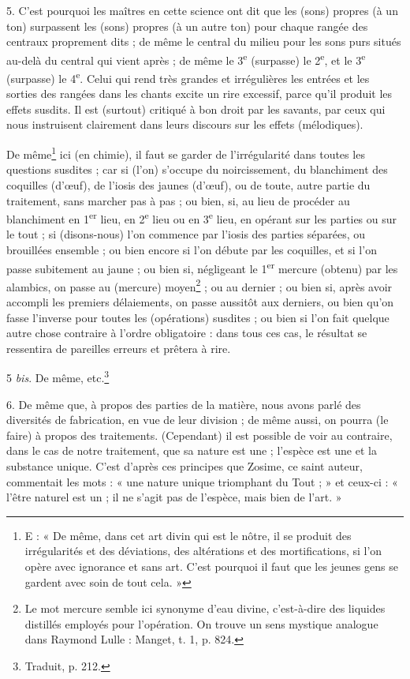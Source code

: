 \documentclass[a4paper, 11pt, oneside, polutonikogreek, french]{article}
\begin{document}
5. C'est pourquoi les maîtres en cette science ont dit que les (sons) propres (à un ton) surpassent les (sons) propres (à un autre ton) pour chaque rangée des centraux proprement dits ; de même le central du milieu pour les sons purs situés au-delà du central qui vient après ; de même le 3\textsuperscript{e} (surpasse) le 2\textsuperscript{e}, et le 3\textsuperscript{e} (surpasse) le 4\textsuperscript{e}. Celui qui rend très grandes et irrégulières les entrées et les sorties des rangées dans les chants excite un rire excessif, parce qu'il produit les effets susdits. Il est (surtout) critiqué à bon droit par les savants, par ceux qui nous instruisent clairement dans leurs discours sur les effets (mélodiques).

De même\footnote{E : « De même, dans cet art divin qui est le nôtre, il se produit des irrégularités et des déviations, des altérations et des mortifications, si l'on opère avec ignorance et sans art. C'est pourquoi il faut que les jeunes gens se gardent avec soin de tout cela. »} ici (en chimie), il faut se garder de l'irrégularité dans toutes les questions susdites ; car si (l'on) s'occupe du noircissement, du blanchiment des coquilles (d'œuf), de l'iosis des jaunes (d'œuf), ou de toute, autre partie du traitement, sans marcher pas à pas ; ou bien, si, au lieu de procéder au blanchiment en 1\textsuperscript{er} lieu, en 2\textsuperscript{e} lieu ou en 3\textsuperscript{e} lieu, en opérant sur les parties ou sur le tout ; si (disons-nous) l'on commence par l'iosis des parties séparées, ou brouillées ensemble ; ou bien encore si l'on débute par les coquilles, et si l'on passe subitement au jaune ; ou bien si, négligeant le 1\textsuperscript{er} mercure (obtenu) par les alambics, on passe au (mercure) moyen\footnote{Le mot mercure semble ici synonyme d'eau divine, c'est-à-dire des liquides distillés employés pour l'opération. On trouve un sens mystique analogue dans Raymond Lulle : Manget, t. 1, p. 824.} ; ou au dernier ; ou bien si, après avoir accompli les premiers délaiements, on passe aussitôt aux derniers, ou bien qu'on fasse l'inverse pour toutes les (opérations) susdites ; ou bien si l'on fait quelque autre chose contraire à l'ordre obligatoire : dans tous ces cas, le résultat se ressentira de pareilles erreurs et prêtera à rire.

5 \emph{bis}. De même, etc.\footnote{Traduit, p. 212.}

6. De même que, à propos des parties de la matière, nous avons parlé des diversités de fabrication, en vue de leur division ; de même aussi, on pourra (le faire) à propos des traitements. (Cependant) il est possible de voir au contraire, dans le cas de notre traitement, que sa nature est une ; l'espèce est une et la substance unique. C'est d'après ces principes que Zosime, ce saint auteur, commentait les mots : « une nature unique triomphant du Tout ; » et ceux-ci : « l'être naturel est un ; il ne s'agit pas de l'espèce, mais bien de l'art. »
\end{document}
